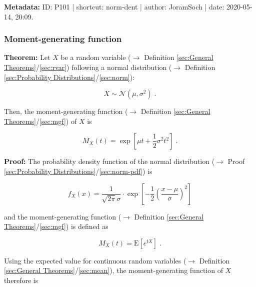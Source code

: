 \documentclass[a4paper,12pt,twoside]{book}
\begin{document}
\vspace{1em}
\textbf{Metadata:} ID: P101 | shortcut: norm-dent | author: JoramSoch | date: 2020-05-14, 20:09.
\vspace{1em}



\subsubsection[\textbf{Moment-generating function}]{Moment-generating function} \label{sec:norm-mgf}
\setcounter{equation}{0}

\textbf{Theorem:} Let $X$ be a random variable ($\rightarrow$ Definition \ref{sec:General Theorems}/\ref{sec:rvar}) following a normal distribution ($\rightarrow$ Definition \ref{sec:Probability Distributions}/\ref{sec:norm}):

\begin{equation} \label{eq:norm-mgf-norm}
X \sim \mathcal{N}(\mu, \sigma^2) \; .
\end{equation}

Then, the moment-generating function ($\rightarrow$ Definition \ref{sec:General Theorems}/\ref{sec:mgf}) of $X$ is

\begin{equation} \label{eq:norm-mgf-norm-mgf}
M_X(t) = \exp\left[ \mu t + \frac{1}{2} \sigma^2 t^2 \right] \; .
\end{equation}


\vspace{1em}
\textbf{Proof:} The probability density function of the normal distribution ($\rightarrow$ Proof \ref{sec:Probability Distributions}/\ref{sec:norm-pdf}) is

\begin{equation} \label{eq:norm-mgf-norm-pdf}
f_X(x) = \frac{1}{\sqrt{2 \pi} \sigma} \cdot \exp \left[ -\frac{1}{2} \left( \frac{x-\mu}{\sigma} \right)^2 \right]
\end{equation}

and the moment-generating function ($\rightarrow$ Definition \ref{sec:General Theorems}/\ref{sec:mgf}) is defined as

\begin{equation} \label{eq:norm-mgf-mgf-var}
M_X(t) = \mathrm{E} \left[ e^{tX} \right] \; .
\end{equation}

Using the expected value for continuous random variables ($\rightarrow$ Definition \ref{sec:General Theorems}/\ref{sec:mean}), the moment-generating function of $X$ therefore is
\end{document}
